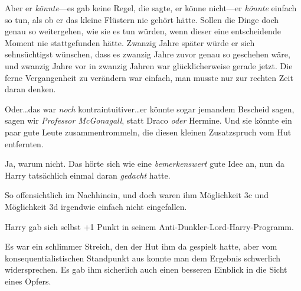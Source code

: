 Aber er \emph{könnte}—es gab keine Regel, die sagte, er könne nicht—er \emph{könnte} einfach so tun, als ob er das kleine Flüstern nie gehört hätte. Sollen die Dinge doch genau so weitergehen, wie sie es tun würden, wenn dieser eine entscheidende Moment nie stattgefunden hätte. Zwanzig Jahre später würde er sich sehnsüchtigst wünschen, dass es zwanzig Jahre zuvor genau so geschehen wäre, und zwanzig Jahre vor in zwanzig Jahren war glücklicherweise gerade jetzt. Die ferne Vergangenheit zu verändern war einfach, man musste nur zur rechten Zeit daran denken.

Oder…das war \emph{noch} kontraintuitiver…er könnte sogar jemandem Bescheid sagen, sagen wir \emph{Professor McGonagall}, statt Draco \emph{oder} Hermine. Und sie könnte ein paar gute Leute zusammentrommeln, die diesen kleinen Zusatzspruch vom Hut entfernten.

Ja, warum nicht. Das hörte sich wie eine \emph{bemerkenswert} gute Idee an, nun da Harry tatsächlich einmal daran \emph{gedacht} hatte.

So offensichtlich im Nachhinein, und doch waren ihm Möglichkeit 3c und Möglichkeit 3d irgendwie einfach nicht eingefallen.

Harry gab sich selbst +1 Punkt in seinem Anti-Dunkler-Lord-Harry-Programm.

Es war ein schlimmer Streich, den der Hut ihm da gespielt hatte, aber vom konsequentialistischen Standpunkt aus konnte man dem Ergebnis schwerlich widersprechen. Es gab ihm sicherlich auch einen besseren Einblick in die Sicht eines Opfers.

